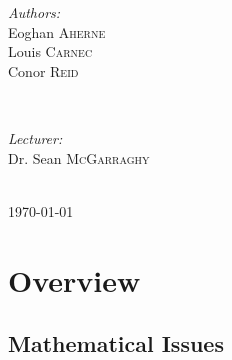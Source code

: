 \documentclass[paper=a4, fontsize=10pt]{article} %
\begin{document}
\begin{titlepage}
\begin{minipage}{0.4\textwidth}
\begin{flushleft} \large
\emph{Authors:}\\
\small{Eoghan \textsc{Aherne}}\\
\small{Louis \textsc{Carnec}}\\
\small{Conor \textsc{Reid}} %
\end{flushleft}
\end{minipage}
~
\begin{minipage}{0.4\textwidth}
\begin{flushright} \large
\emph{Lecturer:} \\
\small{Dr. Sean \textsc{McGarraghy}} %
\end{flushright}
\end{minipage}\\[4cm]


\vspace{3cm}
{\large \today}\\[1cm] %

\vfill %

\end{titlepage}

\tableofcontents
\clearpage
\onecolumn

\section{Overview}

\subsection{Mathematical Issues}
\end{document}
